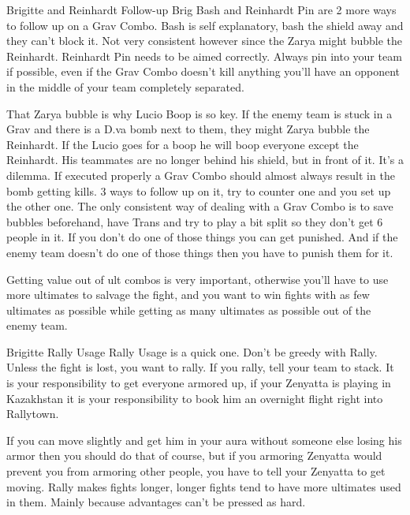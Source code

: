 Brigitte and Reinhardt Follow-up
Brig Bash and Reinhardt Pin are 2 more ways to follow up on a Grav Combo. Bash is self explanatory, bash the shield away and they can’t block it. Not very consistent however since the Zarya might bubble the Reinhardt. 
Reinhardt Pin needs to be aimed correctly. Always pin into your team if possible, even if the Grav Combo doesn’t kill anything you’ll have an opponent in the middle of your team completely separated.

That Zarya bubble is why Lucio Boop is so key. If the enemy team is stuck in a Grav and there is a D.va bomb next to them, they might Zarya bubble the Reinhardt. If the Lucio goes for a boop he will boop everyone except the Reinhardt. His teammates are no longer behind his shield, but in front of it.
It’s a dilemma. If executed properly a Grav Combo should almost always result in the bomb getting kills. 3 ways to follow up on it, try to counter one and you set up the other one. The only consistent way of dealing with a Grav Combo is to save bubbles beforehand, have Trans and try to play a bit split so they don’t get 6 people in it. If you don’t do one of those things you can get punished. And if the enemy team doesn’t do one of those things then you have to punish them for it. 

Getting value out of ult combos is very important, otherwise you’ll have to use more ultimates to salvage the fight, and you want to win fights with as few ultimates as possible while getting as many ultimates as possible out of the enemy team.

Brigitte Rally Usage
Rally Usage is a quick one. Don’t be greedy with Rally. Unless the fight is lost, you want to rally. If you rally, tell your team to stack. It is your responsibility to get everyone armored up, if your Zenyatta is playing in Kazakhstan it is your responsibility to book him an overnight flight right into Rallytown.

If you can move slightly and get him in your aura without someone else losing his armor then you should do that of course, but if you armoring Zenyatta would prevent you from armoring other people, you have to tell your Zenyatta to get moving. Rally makes fights longer, longer fights tend to have more ultimates used in them. Mainly because advantages can’t be pressed as hard.

